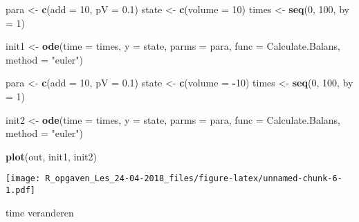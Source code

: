 \documentclass[]{article}
\newenvironment{Shaded}{\begin{snugshade}}{\end{snugshade}}
\newcommand{\KeywordTok}[1]{\textcolor[rgb]{0.13,0.29,0.53}{\textbf{#1}}}
\newcommand{\DataTypeTok}[1]{\textcolor[rgb]{0.13,0.29,0.53}{#1}}
\newcommand{\DecValTok}[1]{\textcolor[rgb]{0.00,0.00,0.81}{#1}}
\newcommand{\FloatTok}[1]{\textcolor[rgb]{0.00,0.00,0.81}{#1}}
\newcommand{\StringTok}[1]{\textcolor[rgb]{0.31,0.60,0.02}{#1}}
\newcommand{\OperatorTok}[1]{\textcolor[rgb]{0.81,0.36,0.00}{\textbf{#1}}}
\newcommand{\NormalTok}[1]{#1}
\begin{document}
\begin{Shaded}
\begin{Highlighting}[]
\NormalTok{para <-}\StringTok{ }\KeywordTok{c}\NormalTok{(}\DataTypeTok{add =} \DecValTok{10}\NormalTok{, }\DataTypeTok{pV =} \FloatTok{0.1}\NormalTok{)}
\NormalTok{state <-}\StringTok{ }\KeywordTok{c}\NormalTok{(}\DataTypeTok{volume =} \DecValTok{10}\NormalTok{)}
\NormalTok{times <-}\StringTok{ }\KeywordTok{seq}\NormalTok{(}\DecValTok{0}\NormalTok{, }\DecValTok{100}\NormalTok{,  }\DataTypeTok{by =} \DecValTok{1}\NormalTok{)}

\NormalTok{init1 <-}\StringTok{ }\KeywordTok{ode}\NormalTok{(}\DataTypeTok{time =}\NormalTok{ times,}
           \DataTypeTok{y =}\NormalTok{ state,}
           \DataTypeTok{parms =}\NormalTok{ para,}
           \DataTypeTok{func =}\NormalTok{ Calculate.Balans,}
           \DataTypeTok{method =} \StringTok{"euler"}\NormalTok{)}

\NormalTok{para <-}\StringTok{ }\KeywordTok{c}\NormalTok{(}\DataTypeTok{add =} \DecValTok{10}\NormalTok{, }\DataTypeTok{pV =} \FloatTok{0.1}\NormalTok{)}
\NormalTok{state <-}\StringTok{ }\KeywordTok{c}\NormalTok{(}\DataTypeTok{volume =} \OperatorTok{-}\DecValTok{10}\NormalTok{)}
\NormalTok{times <-}\StringTok{ }\KeywordTok{seq}\NormalTok{(}\DecValTok{0}\NormalTok{, }\DecValTok{100}\NormalTok{,  }\DataTypeTok{by =} \DecValTok{1}\NormalTok{)}

\NormalTok{init2 <-}\StringTok{ }\KeywordTok{ode}\NormalTok{(}\DataTypeTok{time =}\NormalTok{ times,}
           \DataTypeTok{y =}\NormalTok{ state,}
           \DataTypeTok{parms =}\NormalTok{ para,}
           \DataTypeTok{func =}\NormalTok{ Calculate.Balans,}
           \DataTypeTok{method =} \StringTok{"euler"}\NormalTok{)}
\end{Highlighting}
\end{Shaded}

\begin{Shaded}
\begin{Highlighting}[]
\KeywordTok{plot}\NormalTok{(out, init1, init2)}
\end{Highlighting}
\end{Shaded}

\texttt{[image: R\_opgaven\_Les\_24-04-2018\_files/figure-latex/unnamed-chunk-6-1.pdf]}

time veranderen
\end{document}

